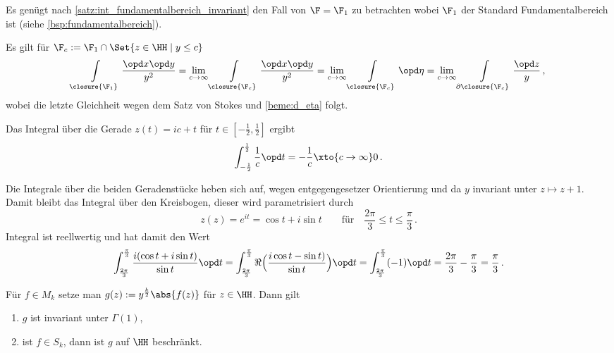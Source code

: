 \begin{bewe}
	Es genügt nach \autoref{satz:int_fundamentalbereich_invariant} den Fall von $\F = \F_1$ zu betrachten wobei $\F_1$ der Standard Fundamentalbereich ist (siehe \autoref{bsp:fundamentalbereich}).
	
	Es gilt für $\F_c := \F_1 \cap \Set{z \in \HH \mid y \leq c}$
	\[
		\int\limits_{\closure{\F_1}} \frac{\opd x \opd y}{y^2}
		= \lim_{c \to \infty} \int\limits_{\closure{\F_c}} \frac{\opd x \opd y}{y^2}
		= \lim_{c \to \infty} \int\limits_{\closure{\F_c}} \opd \eta
		= \lim_{c \to \infty} \int\limits_{\partial \closure{\F_c}} \frac{\opd z}{y}
		\,,
	\]
	wobei die letzte Gleichheit wegen dem Satz von Stokes und \autoref{beme:d_eta} folgt.
	
	Das Integral über die Gerade $z(t) = ic + t$ für $t \in [-\frac{1}{2}, \frac{1}{2}]$ ergibt
	\[
		\int_{-\frac{1}{2}}^{\frac{1}{2}} \frac{1}{c} \opd t = - \frac{1}{c} \xto{c \to \infty} 0
		\,.
	\]
	
	Die Integrale über die beiden Geradenstücke heben sich auf, wegen entgegengesetzer Orientierung und da $y$ invariant unter $z \mapsto z +1$.
	Damit bleibt das Integral über den Kreisbogen, dieser wird parametrisiert durch
	\[
		z(z) = e^{it} = \cos t + i\sin t \qquad \text{für}\quad \frac{2\pi}{3} \leq t \leq \frac{\pi}{3}
		\,.
	\]
	Integral ist reellwertig und hat damit den Wert
	\[
		\int_{\frac{2\pi}{3}}^{\frac{\pi}{3}} \frac{i(\cos t + i\sin t)}{\sin t} \opd t
		= \int_{\frac{2\pi}{3}}^{\frac{\pi}{3}} \Re\Bigl(\frac{i\cos t - \sin t)}{\sin t}\Bigr) \opd t
		= \int_{\frac{2\pi}{3}}^{\frac{\pi}{3}} (-1)\opd t
		= \frac{2\pi}{3} - \frac{\pi}{3} = \frac{\pi}{3}
		\,.
	\]
\end{bewe}

\begin{satz}\label{satz:spitzenformen_beschraenkt}
	Für $f\in M_k$ setze man $g(z) := y^{\frac{k}{2}} \abs{f(z)}$ für $z\in\HH$.
	Dann gilt
	\begin{enumerate}
		\item $g$ ist invariant unter $\Gamma(1)$,
		\item ist $f \in S_k$, dann ist $g$ auf $\HH$ beschränkt.
	\end{enumerate}
\end{satz}

